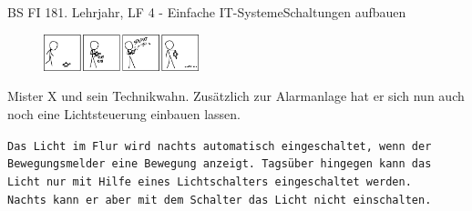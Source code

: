 \documentclass[oneside,openany,headings=optiontotoc,11pt,numbers=noenddot]{scrreprt}
\begin{document}
	\begin{worksheet}{BS FI 18}{1. Lehrjahr, LF 4 - Einfache IT-Systeme}{Schaltungen aufbauen}
		\begin{framed}
			\noindent
			\begin{figure}
				\includegraphics[width=0.4\textwidth,align=c]{../99_Bilder/lamp.png}
			\end{figure}
			\par\noindent
			Mister X und sein Technikwahn. Zusätzlich zur Alarmanlage hat er sich nun auch noch eine Lichtsteuerung einbauen lassen.
			\par
			\begin{addmargin}[0.75cm]{0cm}
				\texttt{Das Licht im Flur wird nachts automatisch eingeschaltet, wenn der Bewegungsmelder eine Bewegung anzeigt. Tagsüber hingegen kann das Licht nur mit Hilfe eines Lichtschalters eingeschaltet werden.\\
				Nachts kann er aber mit dem Schalter das Licht nicht einschalten.}\\
			\end{addmargin}
		\end{framed}
		\begin{framed}
			

\end{framed}
\end{worksheet}
\end{document}
